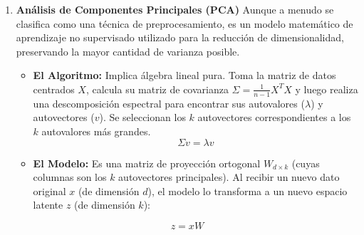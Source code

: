 \begin{enumerate}
\item {\bf Análisis de Componentes Principales (PCA)}
Aunque a menudo se clasifica como una técnica de preprocesamiento, es un modelo matemático de aprendizaje no supervisado utilizado para la reducción de dimensionalidad, preservando la mayor cantidad de varianza posible.

\begin{itemize}
    \item \textbf{El Algoritmo:} Implica álgebra lineal pura. Toma la matriz de datos centrados $X$, calcula su matriz de covarianza $\Sigma = \frac{1}{n-1} X^T X$ y luego realiza una descomposición espectral para encontrar sus autovalores ($\lambda$) y autovectores ($v$). Se seleccionan los $k$ autovectores correspondientes a los $k$ autovalores más grandes.
    \begin{equation}
        \Sigma v = \lambda v
    \end{equation}
    \item \textbf{El Modelo:} Es una matriz de proyección ortogonal $W_{d \times k}$ (cuyas columnas son los $k$ autovectores principales). Al recibir un nuevo dato original $x$ (de dimensión $d$), el modelo lo transforma a un nuevo espacio latente $z$ (de dimensión $k$):
\end{itemize}
\begin{equation}
    z = x W
\end{equation}

\end{enumerate}